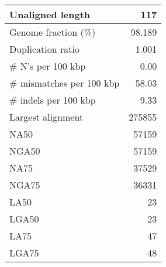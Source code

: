 \documentclass[12pt,a4paper]{article}
\begin{document}
\begin{table}[ht]
\begin{center}
\begin{tabular}{|l*{1}{|r}|}
Unaligned length & 117 \\ \hline
Genome fraction (\%) & 98.189 \\ \hline
Duplication ratio & 1.001 \\ \hline
\# N's per 100 kbp & 0.00 \\ \hline
\# mismatches per 100 kbp & 58.03 \\ \hline
\# indels per 100 kbp & 9.33 \\ \hline
Largest alignment & 275855 \\ \hline
NA50 & 57159 \\ \hline
NGA50 & 57159 \\ \hline
NA75 & 37529 \\ \hline
NGA75 & 36331 \\ \hline
LA50 & 23 \\ \hline
LGA50 & 23 \\ \hline
LA75 & 47 \\ \hline
LGA75 & 48 \\ \hline
\end{tabular}
\end{center}
\end{table}
\end{document}
